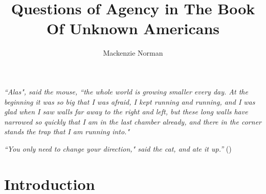 \documentclass{article}
\title{Questions of Agency in \textbf{The Book Of Unknown Americans}}
\author{Mackenzie Norman}
\begin{document}
\maketitle
\noindent\textit{``Alas", said the mouse, ``the whole world is growing smaller every day. At the beginning it was so big that I was afraid, I kept running and running, and I was glad when I saw walls far away to the right and left, but these long walls have narrowed so quickly that I am in the last chamber already, and there in the corner stands the trap that I am running into." }

\textit{ ``You only need to change your direction," said the cat, and ate it up.''} (\cite{eine-fable})

\section*{Introduction}
\end{document}
